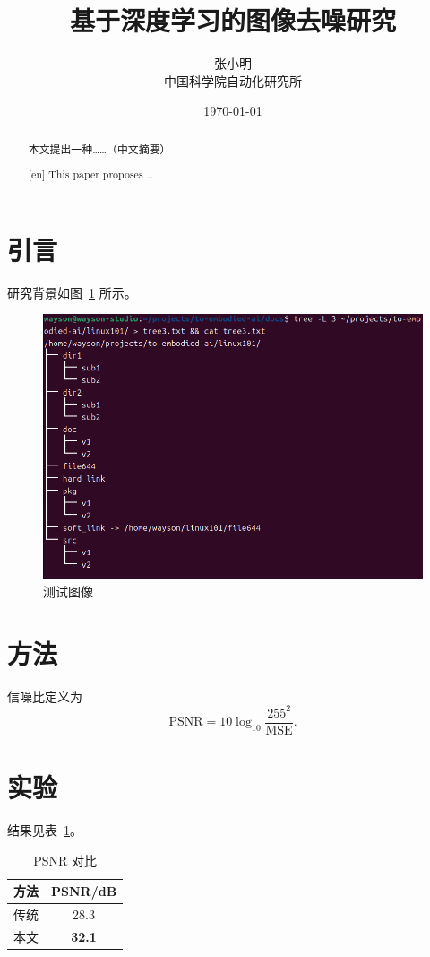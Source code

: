 \documentclass[UTF8,12pt]{ctexart}   %
\title{基于深度学习的图像去噪研究}
\author{张小明 \\ \small 中国科学院自动化研究所}
\date{\today}
\begin{document}
	\maketitle
	
	\begin{abstract}
		本文提出一种……（中文摘要）
	\end{abstract}
	
	\begin{abstract}[en]   %
		This paper proposes …
	\end{abstract}
	
	\section{引言}
	研究背景如图~\ref{fig:lenna} 所示。
	
	\begin{figure}[ht]
		\centering
		\includegraphics[width=0.4\linewidth]{lenna.png}
		\caption{测试图像}
		\label{fig:lenna}
	\end{figure}
	
	\section{方法}
	信噪比定义为
	\begin{equation}
		\mathrm{PSNR}=10\log_{10}\frac{255^2}{\mathrm{MSE}}.
	\end{equation}
	
	\section{实验}
	结果见表~\ref{tab:result}。
	
	\begin{table}[ht]
		\centering
		\caption{PSNR 对比}
		\begin{tabular}{cc}
			\hline
			方法 & PSNR/dB \\
			\hline
			传统 & 28.3 \\
			本文 & \textbf{32.1} \\
			\hline
		\end{tabular}
		\label{tab:result}
	\end{table}
	
	\printbibliography
\end{document}
